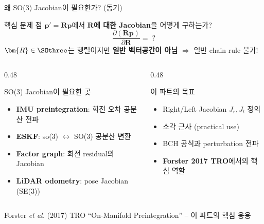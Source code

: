 \begin{frame}[shrink=20]{왜 SO(3) Jacobian이 필요한가? (동기)}
  \begin{block}{핵심 문제}
    점 $\bm{p}' = \bm{R}\bm{p}$에서 \textbf{$\bm{R}$에 대한 Jacobian}을 어떻게 구하는가?
    \[
      \frac{\partial (\bm{R}\bm{p})}{\partial \bm{R}} = \;?
    \]
    $\bm{R} \in \SOthree$는 행렬이지만 \textbf{일반 벡터공간이 아님} $\Rightarrow$ 일반 chain rule 불가!
  \end{block}
  \pause
  \vspace{0.5em}
  \begin{columns}[T]
    \begin{column}{0.48\textwidth}
      \begin{exampleblock}{SO(3) Jacobian이 필요한 곳}
        \begin{itemize}
          \item \textbf{IMU preintegration}: 회전 오차 공분산 전파
          \item \textbf{ESKF}: so(3) $\leftrightarrow$ SO(3) 공분산 변환
          \item \textbf{Factor graph}: 회전 residual의 Jacobian
          \item \textbf{LiDAR odometry}: pose Jacobian (SE(3))
        \end{itemize}
      \end{exampleblock}
    \end{column}
    \begin{column}{0.48\textwidth}
      \begin{alertblock}{이 파트의 목표}
        \begin{itemize}
          \item Right/Left Jacobian $J_r, J_l$ 정의
          \item 소각 근사 (practical use)
          \item BCH 공식과 perturbation 전파
          \item \textbf{Forster 2017 TRO}에서의 핵심 역할
        \end{itemize}
      \end{alertblock}
    \end{column}
  \end{columns}
  \vspace{0.4em}
  \begin{center}
    {\small Forster \textit{et al.} (2017) TRO ``On-Manifold Preintegration'' -- 이 파트의 핵심 응용}
  \end{center}
\end{frame}


